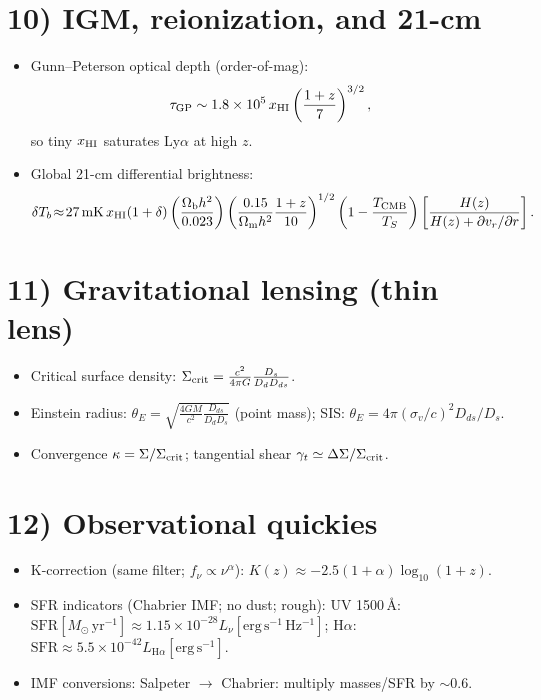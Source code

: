 \documentclass[11pt,a4paper]{article}
\newcommand{\Omm}{\Omega_{\mathrm m}}
\newcommand{\Omb}{\Omega_{\mathrm b}}
\begin{document}
\section*{10) IGM, reionization, and 21-cm}
\begin{itemize}
\item Gunn--Peterson optical depth (order-of-mag):
\[
\tau_{\rm GP}\sim 1.8\times10^5\,x_{\rm HI}\left(\frac{1+z}{7}\right)^{3/2},
\]
so tiny $x_{\rm HI}$ saturates Ly$\alpha$ at high $z$.
\item Global 21-cm differential brightness:
\[
\delta T_b\!\approx\! 27\,\mathrm{mK}\,x_{\rm HI}(1+\delta)
\left(\frac{\Omb h^2}{0.023}\right)
\left(\frac{0.15}{\Omm h^2}\frac{1+z}{10}\right)^{1/2}
\left(1-\frac{T_{\rm CMB}}{T_S}\right)
\left[\frac{H(z)}{H(z)+\partial v_r/\partial r}\right].
\]
\end{itemize}

\section*{11) Gravitational lensing (thin lens)}
\begin{itemize}
\item Critical surface density:
$\Sigma_{\rm crit}=\frac{c^2}{4\pi G}\frac{D_s}{D_d D_{ds}}$.
\item Einstein radius:
$\theta_E=\sqrt{\frac{4GM}{c^2}\frac{D_{ds}}{D_d D_s}}$ (point mass);\;
SIS: $\theta_E=4\pi(\sigma_v/c)^2 D_{ds}/D_s$.
\item Convergence $\kappa=\Sigma/\Sigma_{\rm crit}$;\; tangential shear $\gamma_t\simeq \Delta\Sigma/\Sigma_{\rm crit}$.
\end{itemize}

\section*{12) Observational quickies}
\begin{itemize}
\item K-correction (same filter; $f_\nu\propto \nu^\alpha$):
$K(z)\approx -2.5(1+\alpha)\log_{10}(1+z)$.
\item SFR indicators (Chabrier IMF; no dust; rough):
UV 1500\,\AA: $\mathrm{SFR}[M_\odot\,\mathrm{yr^{-1}}]\approx 1.15\times10^{-28} L_\nu[\mathrm{erg\,s^{-1}\,Hz^{-1}}]$; \;
H$\alpha$: $\mathrm{SFR}\approx 5.5\times10^{-42} L_{\mathrm{H}\alpha}[\mathrm{erg\,s^{-1}}]$.
\item IMF conversions: Salpeter $\to$ Chabrier: multiply masses/SFR by $\sim 0.6$.
\end{itemize}
\end{document}

